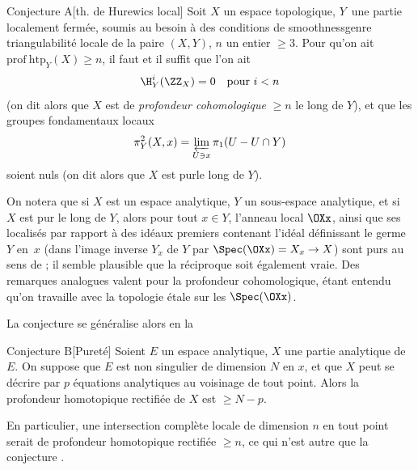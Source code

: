  \label{XIII.6.A}
\begin{enonce*}{Conjecture A}[\og th. de Hurewics local{\fg}\ndemark]
Soit $X$ un espace topologique, $Y$~une partie localement ferm\'ee, soumis au besoin \`a des conditions de \og smoothness\fg genre triangulabilit\'e locale de la paire $(X, Y)$, $n$ un entier $\geq 3$. Pour qu'on ait $\mathrm{prof\:htp}_Y(X)\geq n$, il faut et il suffit que l'on ait\pageoriginale
$$
\H^i_Y(\ZZ_X)=0\quad\text{pour } i<n$$
(on dit alors que $X$ est de \emph{profondeur cohomologique} $\geq n$ le long de $Y$), et que les groupes fondamentaux locaux
$$
\pi^2_Y(X, x)=\varprojlim_{U\ni x} \pi_1(U-U\cap Y)$$
soient nuls (on dit alors que $X$ est \og pur\fg le long de $Y$).
\end{enonce*}

On notera que si $X$ est un espace analytique, $Y$ un sous-espace analytique, et si~$X$ est pur le long de $Y$, alors pour tout $x\in Y$, l'anneau local $\OXx$, ainsi que ses localis\'es par rapport \`a des id\'eaux premiers contenant l'id\'eal d\'efinissant le germe~$Y$ en~$x$ (\ie dans l'image inverse $Y_x$ de $Y$ par $\Spec(\OXx)=X_x\to X$) sont purs au sens de \Exp {}; il semble plausible que la r\'eciproque soit \'egalement vraie. Des remarques analogues valent pour la profondeur cohomologique, \'etant entendu qu'on travaille avec la topologie \'etale sur les $\Spec(\OXx)$.

La conjecture  se g\'en\'eralise alors en la

 \label{XIII.6.B}
\begin{enonce*}{Conjecture B}[\og Puret\'e{\fg}\ndemark]
Soient $E$ un espace analytique, $X$ une partie analytique de $E$. On suppose que $E$ est non singulier de dimension $N$ en $x$, et que $X$ peut se d\'ecrire par $p$ \'equations analytiques au voisinage de tout point. Alors la profondeur homotopique rectifi\'ee de $X$ est $\geq N-p$.
\end{enonce*}

En particulier, une intersection compl\`ete locale de dimension $n$ en tout point serait de profondeur homotopique rectifi\'ee $\geq n$, ce qui n'est autre que la conjecture .

